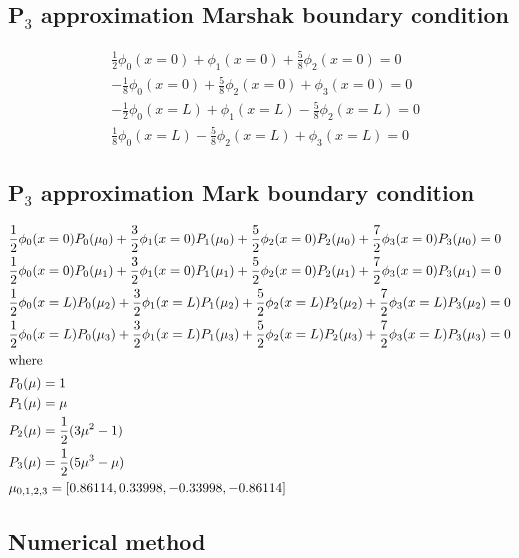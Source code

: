 \documentclass[letterpaper]{article}
\begin{document}
\subsection{P$_3$ approximation Marshak boundary condition}
\label{sec:p3-marshak}

\begin{align}
    & \frac{1}{2}\phi_0 (x=0) + \phi_1 (x=0) + \frac{5}{8}\phi_2 (x=0) = 0   \\
    & -\frac{1}{8}\phi_0 (x=0) + \frac{5}{8}\phi_2 (x=0) + \phi_3 (x=0) = 0  \\
    & -\frac{1}{2}\phi_0 (x=L) + \phi_1 (x=L) - \frac{5}{8}\phi_2 (x=L) = 0  \\
    & \frac{1}{8}\phi_0 (x=L) - \frac{5}{8}\phi_2 (x=L) + \phi_3 (x=L) = 0
\end{align}

\subsection{P$_3$ approximation Mark boundary condition}
\label{sec:p3-mark}

\begin{align}
    & \frac{1}{2}\phi_0 (x=0) P_0(\mu_0) + \frac{3}{2}\phi_1 (x=0) P_1(\mu_0) + \frac{5}{2}\phi_2 (x=0) P_2(\mu_0) + \frac{7}{2}\phi_3 (x=0) P_3(\mu_0) = 0  \\
    & \frac{1}{2}\phi_0 (x=0) P_0(\mu_1) + \frac{3}{2}\phi_1 (x=0) P_1(\mu_1) + \frac{5}{2}\phi_2 (x=0) P_2(\mu_1) + \frac{7}{2}\phi_3 (x=0) P_3(\mu_1) = 0  \\
    & \frac{1}{2}\phi_0 (x=L) P_0(\mu_2) + \frac{3}{2}\phi_1 (x=L) P_1(\mu_2) + \frac{5}{2}\phi_2 (x=L) P_2(\mu_2) + \frac{7}{2}\phi_3 (x=L) P_3(\mu_2) = 0  \\
    & \frac{1}{2}\phi_0 (x=L) P_0(\mu_3) + \frac{3}{2}\phi_1 (x=L) P_1(\mu_3) + \frac{5}{2}\phi_2 (x=L) P_2(\mu_3) + \frac{7}{2}\phi_3 (x=L) P_3(\mu_3) = 0  \\
    \intertext{where}
    & P_0(\mu) = 1    \notag \\
    & P_1(\mu) = \mu  \notag \\
    & P_2(\mu) = \frac{1}{2} (3\mu^2-1)    \notag \\
    & P_3(\mu) = \frac{1}{2} (5\mu^3-\mu)  \notag \\
    & \mu_{0,1,2,3} = [ 0.86114, 0.33998, -0.33998, -0.86114 ] \notag
\end{align}

\subsection{Numerical method}
\end{document}
